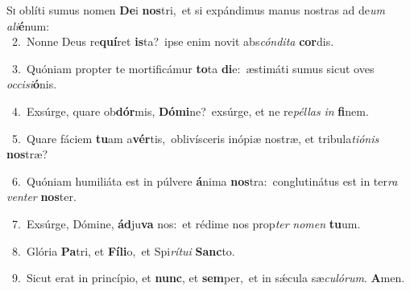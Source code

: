 \lettrine{\initial\textcolor{\initialcolor}{S}}{i} oblíti sumus nomen \textbf{De}\-i \textbf{nos}\-tri,~\star et si expándimus manus nostras ad de\textit{um} \textit{a}\-\textit{li}\textbf{é}num:\\
{\numbfont\textcolor{\numbcolor}{~2.}}~Nonne Deus re\-\textbf{quí}\-ret \textbf{is}\-ta?~\star ipse enim novit abs\-\textit{cón}\-\textit{di}\textit{ta} \textbf{cor}\-dis.\par
{\numbfont\textcolor{\numbcolor}{~3.}}~Quóniam propter te mortificámur \textbf{to}\-ta \textbf{di}\-e:~\star æstimáti sumus sicut oves \textit{oc}\-\textit{ci}\textit{si}\textbf{ó}nis.\par
{\numbfont\textcolor{\numbcolor}{~4.}}~Exsúrge, quare ob\-\textbf{dór}\-mis, \textbf{Dó}\-\textbf{mi}ne?~\star exsúrge, et ne re\-\textit{pél}\-\textit{las} \textit{in} \textbf{fi}\-nem.\par
{\numbfont\textcolor{\numbcolor}{~5.}}~Quare fáciem \textbf{tu}\-am a\-\textbf{vér}\-tis,~\star oblivísceris inópiæ nostræ, et tribula\-\textit{ti}\-\textit{ó}\textit{nis} \textbf{nos}\-træ?\par
{\numbfont\textcolor{\numbcolor}{~6.}}~Quóniam humiliáta est in púlvere \textbf{á}\-nima \textbf{nos}\-tra:~\star conglutinátus est in ter\textit{ra} \textit{ven}\-\textit{ter} \textbf{nos}\-ter.\par
{\numbfont\textcolor{\numbcolor}{~7.}}~Exsúrge, Dómine, \textbf{ád}\-ju\textbf{va} nos:~\star et rédime nos prop\textit{ter} \textit{no}\-\textit{men} \textbf{tu}\-um.\par
{\numbfont\textcolor{\numbcolor}{~8.}}~Glória \textbf{Pa}\-tri, et \textbf{Fí}\-\textbf{li}o,~\star et Spi\-\textit{rí}\-\textit{tu}\textit{i} \textbf{Sanc}\-to.\par
{\numbfont\textcolor{\numbcolor}{~9.}}~Sicut erat in princípio, et \textbf{nunc}\-, et \textbf{sem}\-per,~\star et in sǽcula sæ\-\textit{cu}\-\textit{ló}\textit{rum}. \textbf{A}\-men.\par
